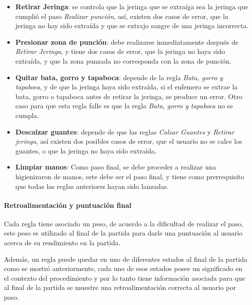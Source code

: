 \begin{itemize}
\item \textbf{Retirar Jeringa}: se controla que la jeringa que se extraíga sea
    la jeringa que cumplió el paso \emph{Realizar punción}, así, existen dos
    casos de error, que la jeringa no hay sido extraída y que se extrajo sangre
    de una jeringa incorrecta.

\item \textbf{Presionar zona de punción}: debe realizarse inmediatamente después
    de \emph{Retirar Jeringa}, y tiene dos casos de error, que la jeringa no
    haya sido extraída, y que la zona punzada no corresponda con la zona de
    punción.

\item \textbf{Quitar bata, gorro y tapaboca}: depende de la regla \emph{Bata,
        gorro y tapaboca}, y de que la jeringa haya sido extraída, si el
    enfemero se extrae la bata, gorro o tapaboca antes de retirar la jeringa, se
    produce un error. Otro caso para que esta regla falle es que la regla
    \emph{Bata, gorro y tapaboca} no se cumpla.

\item \textbf{Descalzar guantes}: depende de que las reglas \emph{Calzar
        Guantes} y \emph{Retirar jeringa}, así existen dos posibles casos de
    error, que el usuario no se calce los guantes, o que la jeringa no haya sido
    extraída.

\item \textbf{Limpiar manos}: Como paso final, se debe proceder a realizar una
    higienizaron de manos, este debe ser el paso final, y tiene como
    prerrequisito que todas las reglas anteriores hayan sido lanzadas.

\end{itemize}

\paragraph{Retroalimentación y puntuación final}
\label{sec:puntuacion_hemocultivo}

Cada regla tiene asociado un peso, de acuerdo a la dificultad de realizar el
paso, este peso es utilizado al final de la partida para darle una puntuación al
usuario acerca de su rendimiento en la partida.

Además, un regla puede quedar en uno de diferentes estados al final de la
partida como se mostró anteriormente, cada uno de esos estados posee un
significado en el contexto del procedimiento y por lo tanto tiene información
asociada para que al final de la partida se muestre una retroalimentación
correcta al usuario por paso.

